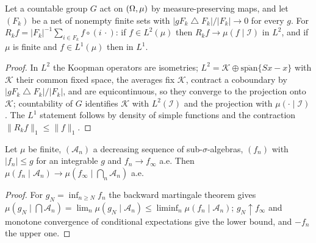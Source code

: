\begin{theorem}
    \label{thm:erg-14A3}
    \leanok

    Let a countable group $G$ act on $(\Omega, \mu)$ by measure-preserving maps, and let $(F_k)$
    be a net of nonempty finite sets with $|gF_k \mathbin{\triangle} F_k| / |F_k| \to 0$ for every
    $g$. For $R_k f = |F_k|^{-1}\sum_{i \in F_k} f \circ (i\,\cdot)$: if $f \in L^2(\mu)$ then
    $R_k f \to \mu(f \mid \mathcal{I})$ in $L^2$, and if $\mu$ is finite and $f \in L^1(\mu)$
    then in $L^1$.
\end{theorem}
\begin{proof}
    \leanok

    In $L^2$ the Koopman operators are isometries; $L^2 = \mathcal{K} \oplus \overline{\mathrm{span}}\{Sx - x\}$
    with $\mathcal{K}$ their common fixed space, the averages fix $\mathcal{K}$, contract a
    coboundary by $|gF_k \mathbin{\triangle} F_k|/|F_k|$, and are equicontinuous, so they converge
    to the projection onto $\mathcal{K}$; countability of $G$ identifies $\mathcal{K}$ with
    $L^2(\mathcal{I})$ and the projection with $\mu(\cdot \mid \mathcal{I})$. The $L^1$ statement
    follows by density of simple functions and the contraction $\|R_k f\|_1 \le \|f\|_1$.
\end{proof}

\begin{lemma}[Georgii (14.19)]
    \label{lem:erg-1419}
    \leanok

    Let $\mu$ be finite, $(\mathcal{A}_n)$ a decreasing sequence of sub-$\sigma$-algebras,
    $(f_n)$ with $|f_n| \le g$ for an integrable $g$ and $f_n \to f_\infty$ a.e. Then
    $\mu(f_n \mid \mathcal{A}_n) \to \mu(f_\infty \mid \bigcap_n \mathcal{A}_n)$ a.e.
\end{lemma}
\begin{proof}
    \leanok

    For $g_N = \inf_{n \ge N} f_n$ the backward martingale theorem gives
    $\mu(g_N \mid \bigcap \mathcal{A}_n) = \lim_n \mu(g_N \mid \mathcal{A}_n) \le
    \liminf_n \mu(f_n \mid \mathcal{A}_n)$; $g_N \uparrow f_\infty$ and monotone convergence of
    conditional expectations give the lower bound, and $-f_n$ the upper one.
\end{proof}

